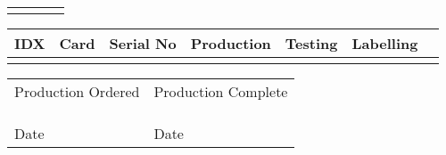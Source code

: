 \documentclass[fontsize = 9pt, BCOR=1.5cm, DIV=14, twoside, titlepage = false]{scrartcl}
\begin{document}
\begin{center}
\normalsize
\renewcommand{\arraystretch}{2}
\begin{tabularx}{1.0\textwidth}{|c|>{\raggedright\arraybackslash}p{}|>{\centering\arraybackslash}p{}|X|}
\hline
  {%
  {%
\end{tabularx}
\small
\renewcommand{\arraystretch}{1.25}
\begin{tabularx}{1.0\textwidth}{|c|>{\raggedright\arraybackslash}p{}|>{\centering\arraybackslash}p{}|>{\raggedright\arraybackslash}p{}|>{\raggedright\arraybackslash}p{}|>{\raggedright\arraybackslash}p{}|X|}
  \hline
  \rowcolor[gray]{0.9}\centering\textbf{\ttfamily IDX} & \centering\textbf{\ttfamily Card} & \centering\textbf{\ttfamily Serial No} &\centering\textbf{\ttfamily Production} & \centering\textbf{\ttfamily Testing} & \centering\textbf{\ttfamily Labelling} & \tabularnewline\hline
  \small{\ttfamily %
  
\end{tabularx}

\end{center}

\begin{tabularx}{1.0\textwidth}{|>{\centering\arraybackslash}p{}|>{\centering\arraybackslash}p{}|}
\hline
  \small Production Ordered & \small Production Complete\\
  & \\
  & \\
  & \\
  \small Date & \small Date \\
\hline
\end{tabularx}
\end{document}
